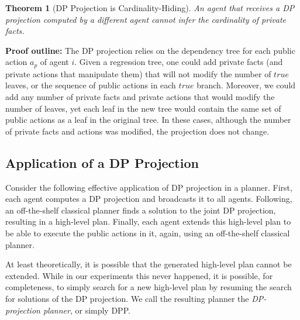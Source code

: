 \documentclass[letterpaper]{article}
\newtheorem{theorem}{Theorem}
\newcommand\guy[1]{\textcolor{red}{guy: #1}}
\theoremstyle{definition}
\begin{document}
\begin{theorem}[DP Projection is Cardinality-Hiding]
An agent that receives a DP projection computed by a different agent 
cannot infer the cardinality of private facts. 
\label{the:dp-proof}
\end{theorem}
{\bf Proof outline:}
The DP projection relies on the dependency tree for each public action $a_p$ of agent $i$. Given a regression tree, one could add private facts (and private actions that manipulate them) that will not modify the number of $true$ leaves, or the sequence of public actions in each $true$ branch.
Moreover, we could add any number of private facts and private actions that would modify the number of leaves, yet each leaf in the new tree would contain the same set of public actions as a leaf in the original tree. In these cases, although the number of private facts and actions was modified, the projection  does not change. 




\subsection{Application of a DP Projection}
Consider the following effective application of DP projection in a planner. First, each agent computes a DP projection and broadcasts it to all agents. Following, an off-the-shelf classical planner finds a solution to the joint DP projection, resulting in a  high-level plan. Finally, each agent extends this high-level plan to be able to execute the public actions in it, again, using an off-the-shelf classical planner.  

At least theoretically, it is possible that the generated high-level plan cannot be extended. While in our experiments this never happened, it is possible, for completeness, to simply search for a new high-level plan by resuming the search for solutions of the DP projection. We call the resulting planner the {\em DP-projection planner}, or simply DPP.


\end{document}
